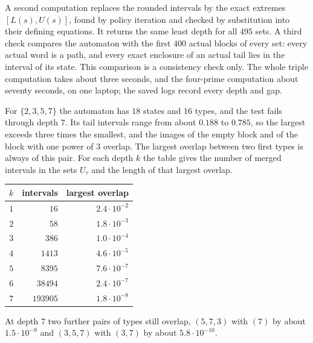 \documentclass[11pt]{article}
\theoremstyle{remark}
\theoremstyle{plain}
\begin{document}
A second computation replaces the rounded intervals by the exact extremes
$[L(s),U(s)]$, found by policy iteration and checked by substitution into
their defining equations.  It returns the same least depth for all $495$
sets.  A third check compares the automaton with the first $400$ actual
blocks of every set: every actual word is a path, and every exact enclosure
of an actual tail lies in the interval of its state.  This comparison is a
consistency check only.  The whole triple computation takes about three
seconds, and the four-prime computation about seventy seconds, on one
laptop; the saved logs record every depth and gap.

For $\{2,3,5,7\}$ the automaton has $18$ states and $16$ types, and the test
fails through depth $7$.  Its tail intervals range from about $0.188$ to
$0.785$, so the largest exceeds three times the smallest, and the images of
the empty block and of the block with one power of $3$ overlap.  The largest
overlap between two first types is always of this pair.  For each depth $k$
the table gives the number of merged intervals in the sets $U_\tau$ and the
length of that largest overlap.
\begin{center}\small
\begin{tabular}{@{}rrr@{}}
\hline
$k$ & intervals & largest overlap\\\hline
$1$ & $16$ & $2.4\cdot10^{-2}$\\
$2$ & $58$ & $1.8\cdot10^{-3}$\\
$3$ & $386$ & $1.0\cdot10^{-4}$\\
$4$ & $1413$ & $4.6\cdot10^{-5}$\\
$5$ & $8395$ & $7.6\cdot10^{-7}$\\
$6$ & $38494$ & $2.4\cdot10^{-7}$\\
$7$ & $193905$ & $1.8\cdot10^{-8}$\\\hline
\end{tabular}
\end{center}
At depth $7$ two further pairs of types still overlap, $(5,7,3)$ with $(7)$
by about $1.5\cdot10^{-9}$ and $(3,5,7)$ with $(3,7)$ by about
$5.8\cdot10^{-10}$.
\end{document}
